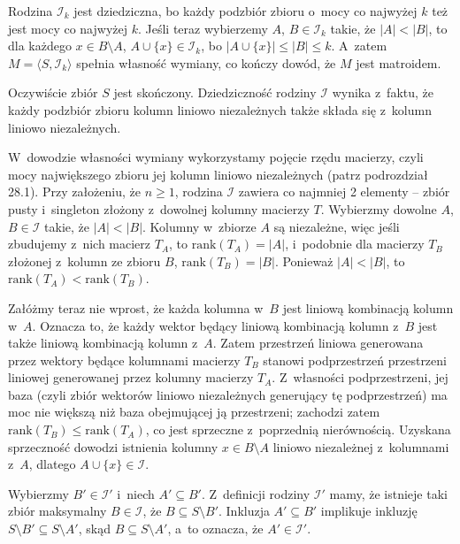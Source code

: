 
\exercise %
Rodzina $\mathcal{I}_k$ jest dziedziczna, bo każdy podzbiór zbioru o~mocy co najwyżej $k$ też jest mocy co najwyżej $k$.
Jeśli teraz wybierzemy $A$, $B\in\mathcal{I}_k$ takie, że $|A|<|B|$, to dla każdego $x\in B\setminus A$, $A\cup\{x\}\in\mathcal{I}_k$, bo $|A\cup\{x\}|\le|B|\le k$.
A~zatem $M=\langle S,\mathcal{I}_k\rangle$ spełnia własność wymiany, co kończy dowód, że $M$ jest matroidem.

\exercise %

\noindent Oczywiście zbiór $S$ jest skończony.
Dziedziczność rodziny $\mathcal{I}$ wynika z~faktu, że każdy podzbiór zbioru kolumn liniowo niezależnych także składa się z~kolumn liniowo niezależnych.

W~dowodzie własności wymiany wykorzystamy pojęcie rzędu macierzy, czyli mocy największego zbioru jej kolumn liniowo niezależnych (patrz podrozdział 28.1).
Przy założeniu, że $n\ge1$, rodzina $\mathcal{I}$ zawiera co najmniej 2 elementy -- zbiór pusty i~singleton złożony z~dowolnej kolumny macierzy $T$.
Wybierzmy dowolne $A$, $B\in\mathcal{I}$ takie, że $|A|<|B|$.
Kolumny w~zbiorze $A$ są niezależne, więc jeśli zbudujemy z~nich macierz $T_A$, to $\mathrm{rank}(T_A)=|A|$, i~podobnie dla macierzy $T_B$ złożonej z~kolumn ze zbioru $B$, $\mathrm{rank}(T_B)=|B|$.
Ponieważ $|A|<|B|$, to $\mathrm{rank}(T_A)<\mathrm{rank}(T_B)$.

Załóżmy teraz nie wprost, że każda kolumna w~$B$ jest liniową kombinacją kolumn w~$A$.
Oznacza to, że każdy wektor będący liniową kombinacją kolumn z~$B$ jest także liniową kombinacją kolumn z~$A$.
Zatem przestrzeń liniowa generowana przez wektory będące kolumnami macierzy $T_B$ stanowi podprzestrzeń przestrzeni liniowej generowanej przez kolumny macierzy $T_A$.
Z~własności podprzestrzeni, jej baza (czyli zbiór wektorów liniowo niezależnych generujący tę podprzestrzeń) ma moc nie większą niż baza obejmującej ją przestrzeni; zachodzi zatem $\mathrm{rank}(T_B)\le\mathrm{rank}(T_A)$, co jest sprzeczne z~poprzednią nierównością.
Uzyskana sprzeczność dowodzi istnienia kolumny $x\in B\setminus A$ liniowo niezależnej z~kolumnami z~$A$, dlatego $A\cup\{x\}\in\mathcal{I}$.

\exercise %
Wybierzmy $B'\in\mathcal{I}'$ i~niech $A'\subseteq B'$.
Z~definicji rodziny $\mathcal{I}'$ mamy, że istnieje taki zbiór maksymalny $B\in\mathcal{I}$, że $B\subseteq S\setminus B'$.
Inkluzja $A'\subseteq B'$ implikuje inkluzję $S\setminus B'\subseteq S\setminus A'$, skąd $B\subseteq S\setminus A'$, a~to oznacza, że $A'\in\mathcal{I}'$.

